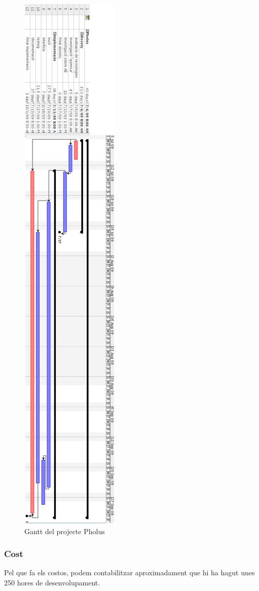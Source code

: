 \begin{figure}[h]
	\begin{center}
		\includegraphics[scale=0.39]{pholus/pholus-gantt.png}
	\end{center}
	\caption{Gantt del projecte Pholus}
	\label{fig:pholus-gantt}
\end{figure}

\subsubsection{Cost} %
\label{ssub:Cost}

Pel que fa els costos, podem contabilitzar aproximadament que hi ha hagut unes
250 hores de desenvolupament.

%
